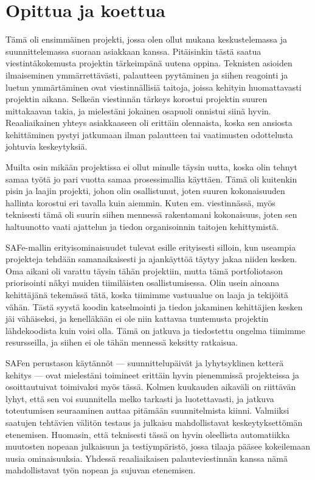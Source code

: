 \documentclass{article}
\begin{document}
\section{Opittua ja koettua}

Tämä oli ensimmäinen projekti, jossa olen ollut mukana keskustelemassa ja
suunnittelemassa suoraan asiakkaan kanssa. Pitäisinkin tästä saatua
viestintäkokemusta projektin tärkeimpänä uutena oppina. Teknisten asioiden
ilmaiseminen ymmärrettävästi, palautteen pyytäminen ja siihen reagointi ja
luetun ymmärtäminen ovat viestinnällisiä taitoja, joissa kehityin huomattavasti
projektin aikana. Selkeän viestinnän tärkeys korostui projektin suuren
mittakaavan takia, ja mieles\-tä\-ni jokainen osapuoli onnistui siinä hyvin.
Reaaliaikainen yhteys asiakkaaseen oli erittäin olennaista, koska sen ansiosta
kehittäminen pystyi jatkumaan ilman palautteen tai vaatimusten odottelusta
johtuvia keskeytyksiä.

Muilta osin mikään projektissa ei ollut minulle täysin uutta, koska olin tehnyt
samaa työtä jo pari vuotta samaa prosessimallia käyttäen. Tämä oli kuitenkin
pisin ja laajin projekti, johon olin osallistunut, joten suuren kokonaisuuden
hallinta korostui eri tavalla kuin aiemmin. Kuten em. vies\-tinnässä, myös
teknisesti tämä oli suurin siihen mennessä rakentamani kokonaisuus, joten sen
hal\-tuun\-otto vaati ajattelun ja tiedon organisoinnin taitojen kehittymistä.

SAFe-mallin erityisominaisuudet tulevat esille erityisesti silloin, kun
useampia projekteja tehdään samanaikai\-sesti ja ajankäyttöä täytyy jakaa
niiden kesken. Oma aikani oli varattu täysin tähän projektiin, mutta tämä
portfoliotason priorisointi näkyi muiden tiimiläisten osallistumisessa. Olin
usein ainoana kehittäjänä tekemässä tätä, koska tiimimme vastuualue on laaja ja
tekijöitä vähän. Tästä syystä koodin katselmointi ja tiedon jakaminen
kehittäjien kesken jäi vähäiseksi, ja kenelläkään ei ole niin kattavaa
tuntemusta projektin lähdekoodista kuin voisi olla. Tämä on jatkuva ja
tiedostettu ongelma tiimimme resursseilla, ja siihen ei ole tähän mennessä
keksitty ratkaisua.

SAFen perustason käytännöt — suunnittelupäivät ja lyhytsyklinen ketterä kehitys
— ovat mielestäni toimineet erittäin hyvin pienemmissä projekteissa ja
osoittautuivat toimivaksi myös tässä. Kolmen kuukauden aikaväli on riittävän
lyhyt, että sen voi suunnitella melko tarkasti ja luotettavasti, ja jatkuva
toteutumisen seuraaminen auttaa pitämään suunnitelmista kiinni. Valmiik\-si
saatujen tehtävien välitön testaus ja julkaisu mahdollistavat keskeytyksettömän
etenemisen. Huomasin, että teknisesti tässä on hyvin oleellista automatiikka
muutosten nopeaan julkai\-suun ja testiympäristö, jossa tilaaja pääsee
kokeilemaan uusia ominaisuuksia. Yhdessä reaali\-aikaisen palauteviestinnän
kanssa nämä mahdollistavat työn nopean ja sujuvan etenemisen.
\end{document}
